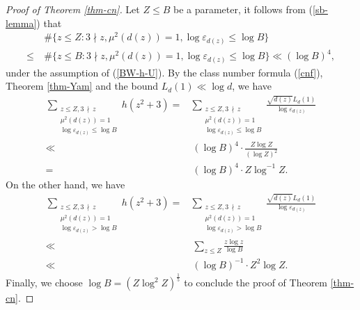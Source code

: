 \documentclass[reqno, 11pt, twoside]{amsart}
\numberwithin{equation}{section}
\theoremstyle{definition}
\renewcommand{\leq}{\leqslant}
\newcommand{\eps}{\varepsilon}
\begin{document}
	
\begin{proof}[Proof of Theorem \ref{thm-cn}]
Let $Z \leq B$ be a parameter, it follows from (\ref{sb-lemma}) that
	\begin{align*}
		& \ \# \{ z \leq Z: 3  \nmid  z, \mu^2(d(z)) = 1, \log \eps_{d(z)} \leq \log B \} \\
		 \leq & \ \# \{ z \leq B: 3  \nmid  z, \mu^2(d(z)) = 1, \log \eps_{d(z)} \leq \log B \}  \ll (\log B)^4,
	\end{align*}
under the assumption of (\ref{BW-h-U}).
By the class number formula (\ref{cnf}), Theorem \ref{thm-Yam} and the bound $L_d(1) \ll \log d$, we have
	\begin{align*}
		\sum_{\substack{z \leq Z, 3 \, \nmid \, z \\ \mu^2(d(z)) = 1 \\ \log \eps_{d(z)} \leq \log B}} h(z^2 + 3)  = & \sum_{\substack{z \leq Z, 3 \, \nmid \, z \\ \mu^2(d(z)) = 1  \\ \log \eps_{d(z)} \leq \log B}} \frac{\sqrt{d(z)} L_d(1)}{\log \eps_{d(z)}} \\
		 \ll & \  (\log B)^4 \cdot \frac{Z \log Z}{(\log Z)^2} \\
		  = & \ (\log B)^4 \cdot Z \log^{-1} Z.
	\end{align*}
On the other hand, we have
	\begin{align*}
		\sum_{\substack{z \leq Z, 3 \, \nmid \, z \\ \mu^2(d(z)) = 1  \\ \log \eps_{d(z)} > \log B}} h(z^2 + 3)  = & \sum_{\substack{z \leq Z, 3 \, \nmid \, z \\ \mu^2(d(z)) = 1  \\ \log \eps_{d(z)} > \log B}} \frac{\sqrt{d(z)} L_d(1)}{\log \eps_{d(z)}} \\
		 \ll & \  \sum_{z \leq Z} \frac{z \log z}{\log B} \\
		 \ll &  \  (\log B)^{-1} \cdot Z^2 \log Z.
	\end{align*}
Finally, we choose $\log B = (Z \log^2 Z)^{\frac{1}{5}}$ to conclude the proof of Theorem \ref{thm-cn}.
\end{proof}	



\bigskip 
\end{document}
